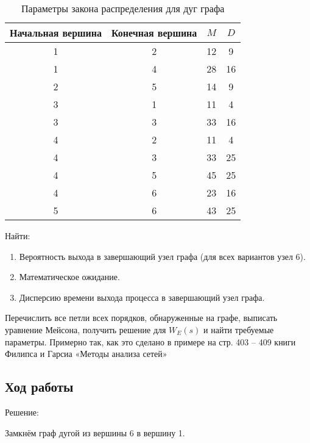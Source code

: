 \begin{table}[htb]
\centering
	\begin{tabular}{|c|c|c|c|}
	\hline 
	Начальная вершина & Конечная вершина & $M$ & $D$ \\ 
	\hline 
	1 & 2 & 12 & 9 \\ 
	\hline 
	1 & 4 & 28 & 16 \\ 
	\hline 
	2 & 5 & 14 & 9 \\ 
	\hline 
	3 & 1 & 11 & 4 \\ 
	\hline 
	3 & 3 & 33 & 16 \\ 
	\hline 
	4 & 2 & 11 & 4 \\ 
	\hline 
	4 & 3 & 33 & 25 \\ 
	\hline 
	4 & 5 & 45 & 25 \\ 
	\hline 
	4 & 6 & 23 & 16 \\ 
	\hline 
	5 & 6 & 43 & 25 \\ 
	\hline 
	\end{tabular} 
\caption{Параметры закона распределения для дуг графа}
\end{table}

Найти:
\begin{enumerate}
	\item Вероятность выхода в завершающий узел графа (для всех вариантов узел 6).
	\item Математическое ожидание.
	\item Дисперсию времени выхода процесса в завершающий узел графа.
\end{enumerate}

Перечислить все петли всех порядков, обнаруженные на графе, выписать уравнение Мейсона, получить решение для $W_E(s)$ и найти требуемые параметры. Примерно так, как это сделано в примере на стр. 403 -- 409 книги Филипса и Гарсиа «Методы анализа сетей»

\subsection{Ход работы}
Решение:

Замкнём граф дугой из вершины 6 в вершину 1.


